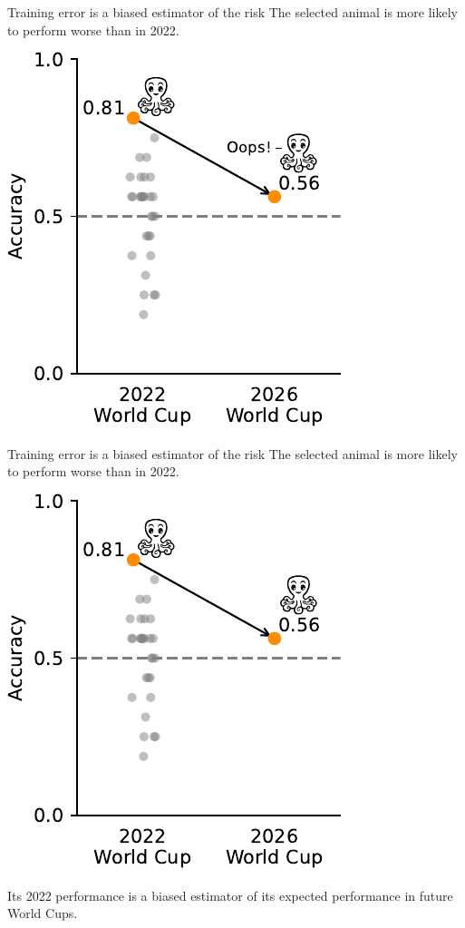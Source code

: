 \documentclass[presentation,mathserif,table]{beamer}
\begin{document}
\begin{frame}[label={sec:orgc24bf8c}]{Training error is a biased estimator of the risk}
The selected animal is more likely to perform \alert{worse} than in 2022.
\begin{center}
\includegraphics[height=.65 \textheight]{figures/generated/select_evaluate/select_evaluate_3.pdf}
\end{center}
\end{frame}
\begin{frame}[label={sec:org81f35bb}]{Training error is a biased estimator of the risk}
The selected animal is more likely to perform \alert{worse} than in 2022.
\begin{center}
\includegraphics[height=.65 \textheight]{figures/generated/select_evaluate/select_evaluate_3b.pdf}
\end{center}
Its 2022 performance is a \alert{biased} estimator of its expected performance in future World Cups.
\end{frame}
\end{document}
